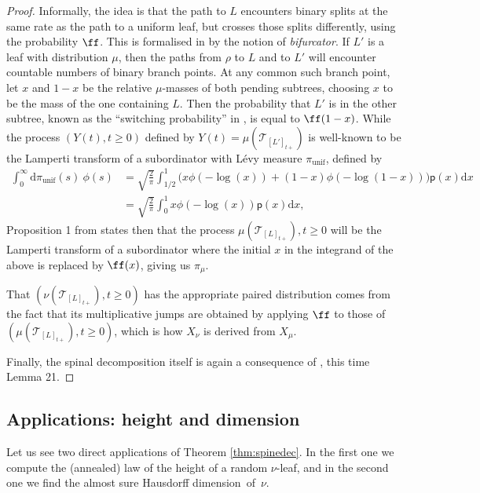 \documentclass[JEP,XML,SOM,Unicode,NoFloatCountersInSection, NoEqCountersInSection,published]{cedram}
\newcommand{\pp}{\mathsf{p}}
\newcommand{\T}{\mathcal{T}}\let\CRT\T\let\tbr\T
\newcommand{\dd}{\mathrm{d}}
\theoremstyle{definition}
\begin{document}
\begin{proof}
Informally, the idea is that the path to $L$ encounters binary splits at the same rate as the path to a uniform leaf, but crosses those splits differently, using the probability $\ff$. This is formalised in \cite{PitmanWinkel2013} by the notion of \emph{bifurcator}. If $L'$ is a leaf with distribution $\mu$, then the paths from $\rho$ to $L$ and to $L'$ will encounter countable numbers of binary branch points. At any common such branch point, let $x$ and $1-x$ be the relative $\mu$-masses of both pending subtrees, choosing $x$ to be the mass of the one containing $L$. Then the probability that $L'$ is in the other subtree, known as the ``switching probability'' in \cite{PitmanWinkel2013}, is equal to $\ff(1-x)$. While the process $(Y(t),t\geq 0)$ defined by $Y(t)=\mu(\T_{[L']_{t+}})$ is well-known \cite[\S 4]{bertoin2002self} to be the Lamperti transform of a subordinator with Lévy measure $\pi_{\mathrm{unif}}$, defined by
\begin{align*}
\int_{0}^{\infty} \mathrm{d} \pi_{\mathrm{unif}}(s) \ \phi(s) &= \sqrt{\frac{2}{\pi}} \int_{1/2}^{1} \bigl(x \phi(-\log (x)) + (1-x) \phi(-\log (1-x))\bigr)\pp(x)\dd x \\
&= \sqrt{\frac{2}{\pi}} \int_0^{1} x \phi(-\log (x))\pp(x)\dd x,
\end{align*}
Proposition 1 from \cite{PitmanWinkel2013} states then that the process $\mu(\T_{[L]_{t+}}),t\geq 0$ will be the Lamperti transform of a subordinator where the initial $x$ in the integrand of the above is replaced by $\ff(x)$, giving us $\pi_\mu$.

That $(\nu(\T_{[L]_{t+}}),t\geq 0)$ has the appropriate paired distribution comes from the fact that its multiplicative jumps are obtained by applying $\ff$ to those of $(\mu(\T_{[L]_{t+}}),t\geq 0)$, which is how $X_{\nu}$ is derived from $X_{\mu}$.

Finally, the spinal decomposition itself is again a consequence of \cite{PitmanWinkel2013}, this time Lemma 21.
\end{proof}
\subsection{Applications: height and dimension}

Let us see two direct applications of Theorem \ref{thm:spinedec}. In the first one we compute the (annealed) law of the height of a random $\nu$-leaf, and in the second one we find the almost sure Hausdorff dimension~of~$\nu$.
\end{document}
